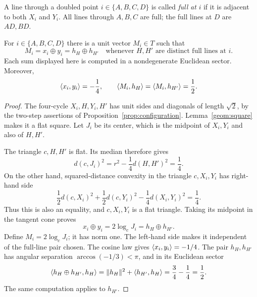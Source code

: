 A line through a doubled point $i\in\{A,B,C,D\}$ is called
\emph{full at $i$} if it is adjacent to both $X_i$ and $Y_i$.
All lines through $A,B,C$ are full; the full lines at $D$ are $AD,BD$.

\begin{lemma}
\label{geom:fan-sums}
For $i\in\{A,B,C,D\}$ there is a unit vector $M_i\in T$ such that
\begin{equation}
 M_i=x_i\oplus y_i=h_H\oplus h_{H'}
 \quad\text{whenever }H,H'\text{ are distinct full lines at }i.
 \label{geom:fan-identities}
\end{equation}
Each sum displayed here is computed in a nondegenerate Euclidean
sector.  Moreover,
\begin{equation}
 \langle x_i,y_i\rangle=-\frac14,
 \qquad
 \langle M_i,h_H\rangle=\langle M_i,h_{H'}\rangle=\frac12.
 \label{geom:fan-products}
\end{equation}
\end{lemma}

\begin{proof}
The four-cycle $X_i,H,Y_i,H'$ has unit sides and diagonals of length
$\sqrt2$, by the two-step assertions of
Proposition~\ref{prop:configuration}.  Lemma~\ref{geom:square} makes it
a flat square.  Let $J_i$ be its center, which is the midpoint of
$X_i,Y_i$ and also of $H,H'$.

The triangle $c,H,H'$ is flat.  Its median therefore gives
\[
 d(c,J_i)^2=r^2-\frac14 d(H,H')^2=\frac14.
\]
On the other hand, squared-distance convexity in the triangle
$c,X_i,Y_i$ has right-hand side
\[
 \frac12 d(c,X_i)^2+\frac12 d(c,Y_i)^2
       -\frac14 d(X_i,Y_i)^2
 =\frac14.
\]
Thus this is also an equality, and $c,X_i,Y_i$ is a flat triangle.
Taking its midpoint in the tangent cone proves
\[
 x_i\oplus y_i=2\log_c J_i=h_H\oplus h_{H'}.
\]
Define $M_i=2\log_c J_i$; it has norm one.  The left-hand side makes
it independent of the full-line pair chosen.  The cosine law gives
$\langle x_i,y_i\rangle=-1/4$.  The pair $h_H,h_{H'}$ has angular separation
$\arccos(-1/3)<\pi$, and in its Euclidean sector
\[
 \langle h_H\oplus h_{H'},h_H\rangle
 =\lVert h_H\rVert^2+\langle h_{H'},h_H\rangle
 =\frac34-\frac14=\frac12.
\]
The same computation applies to $h_{H'}$.
\end{proof}

